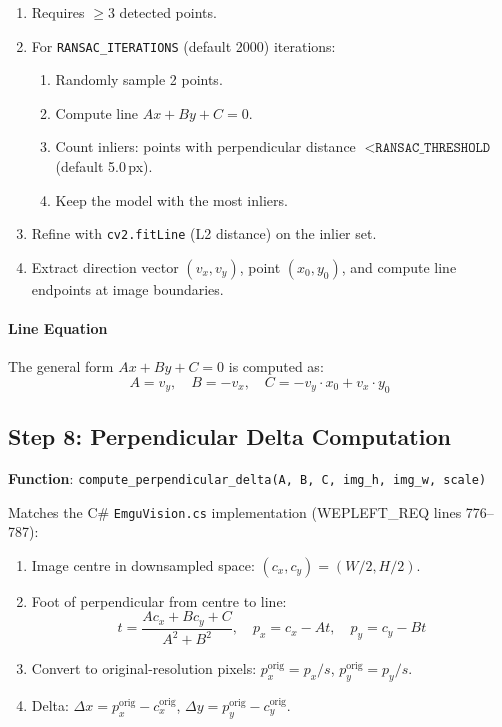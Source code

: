 \documentclass[11pt,a4paper]{article}
\begin{document}
\begin{enumerate}
\item Requires $\geq 3$ detected points.
\item For \texttt{RANSAC\_ITERATIONS} (default 2000) iterations:
  \begin{enumerate}
  \item Randomly sample 2 points.
  \item Compute line $Ax + By + C = 0$.
  \item Count inliers: points with perpendicular distance $< \texttt{RANSAC\_THRESHOLD}$ (default 5.0\,px).
  \item Keep the model with the most inliers.
  \end{enumerate}
\item Refine with \texttt{cv2.fitLine} (L2 distance) on the inlier set.
\item Extract direction vector $(v_x, v_y)$, point $(x_0, y_0)$, and compute line endpoints at image boundaries.
\end{enumerate}

\paragraph{Line Equation}
The general form $Ax + By + C = 0$ is computed as:
\[A = v_y, \quad B = -v_x, \quad C = -v_y \cdot x_0 + v_x \cdot y_0\]

\subsection{Step 8: Perpendicular Delta Computation}
\textbf{Function}: \texttt{compute\_perpendicular\_delta(A, B, C, img\_h, img\_w, scale)}

Matches the C\# \texttt{EmguVision.cs} implementation (WEPLEFT\_REQ lines 776--787):
\begin{enumerate}
\item Image centre in downsampled space: $(c_x, c_y) = (W/2, H/2)$.
\item Foot of perpendicular from centre to line:
\[
t = \frac{Ac_x + Bc_y + C}{A^2 + B^2}, \quad p_x = c_x - At, \quad p_y = c_y - Bt
\]
\item Convert to original-resolution pixels: $p_x^\text{orig} = p_x / s$, $p_y^\text{orig} = p_y / s$.
\item Delta: $\Delta x = p_x^\text{orig} - c_x^\text{orig}$, $\Delta y = p_y^\text{orig} - c_y^\text{orig}$.
\end{enumerate}
\end{document}
